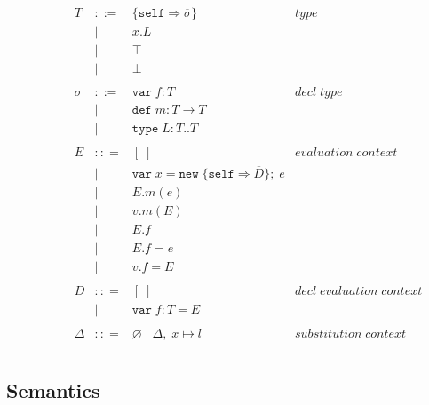 \documentclass{llncs}
\begin{document}
\[\begin{array}{lll}
& ~~~~~~
&
\begin{array}{lllr}
T & ::= & \{\texttt{self} \Rightarrow \overline{\sigma}\} & type \\
& | & x.L &\\
& | & \top & \\
& | & \bot & \\
&&\\
\sigma & ::= & \texttt{var} \; f:T & decl \; type\\
       & |   & \texttt{def} \; m:T \rightarrow T \\
		 & |   & \texttt{type} \; L : T .. T &\\
&&\\
E & :: = & [\;] & evaluation \; context \\
       & | & \texttt{var} \; x = \texttt{new} \; \{\texttt{self} \Rightarrow \overline{D}\}; \; e& \\
       & | & E.m(e)\\
       & | & v.m(E)\\
       & | & E.f\\
       & | & E.f = e\\
       & | & v.f = E\\
&&\\
D & :: = & [\;] & decl \; evaluation \; context \\
       & | & \texttt{var} \; f : T = E\\
&&\\
\Delta & :: = & \varnothing \; | \; \Delta,\; x \mapsto l & substitution \; context \\
\end{array}
\end{array}
\]

\subsection{Semantics}







\end{document}
